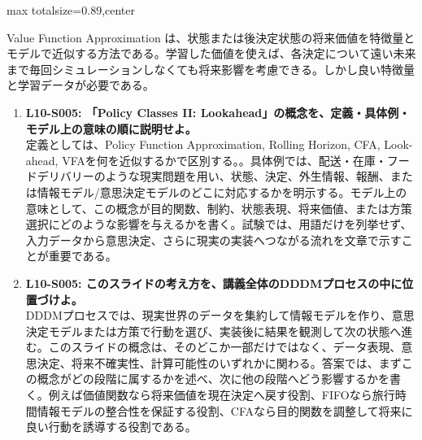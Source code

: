 \begin{minipage}[t]{0.58\textwidth}
\begin{adjustbox}{max totalsize={\textwidth}{0.89\textheight},center}
\begin{minipage}{\textwidth}
Value Function Approximation は、状態または後決定状態の将来価値を特徴量とモデルで近似する方法である。学習した価値を使えば、各決定について遠い未来まで毎回シミュレーションしなくても将来影響を考慮できる。しかし良い特徴量と学習データが必要である。\par{}\begin{enumerate}\item \textbf{L10-S005: 「Policy Classes II: Lookahead」の概念を、定義・具体例・モデル上の意味の順に説明せよ。}\\定義としては、Policy Function Approximation, Rolling Horizon, CFA, Look-ahead, VFAを何を近似するかで区別する。。具体例では、配送・在庫・フードデリバリーのような現実問題を用い、状態、決定、外生情報、報酬、または情報モデル/意思決定モデルのどこに対応するかを明示する。モデル上の意味として、この概念が目的関数、制約、状態表現、将来価値、または方策選択にどのような影響を与えるかを書く。試験では、用語だけを列挙せず、入力データから意思決定、さらに現実の実装へつながる流れを文章で示すことが重要である。\item \textbf{L10-S005: このスライドの考え方を、講義全体のDDDMプロセスの中に位置づけよ。}\\DDDMプロセスでは、現実世界のデータを集約して情報モデルを作り、意思決定モデルまたは方策で行動を選び、実装後に結果を観測して次の状態へ進む。このスライドの概念は、そのどこか一部だけではなく、データ表現、意思決定、将来不確実性、計算可能性のいずれかに関わる。答案では、まずこの概念がどの段階に属するかを述べ、次に他の段階へどう影響するかを書く。例えば価値関数なら将来価値を現在決定へ戻す役割、FIFOなら旅行時間情報モデルの整合性を保証する役割、CFAなら目的関数を調整して将来に良い行動を誘導する役割である。\end{enumerate}
\end{minipage}
\end{adjustbox}
\end{minipage}


